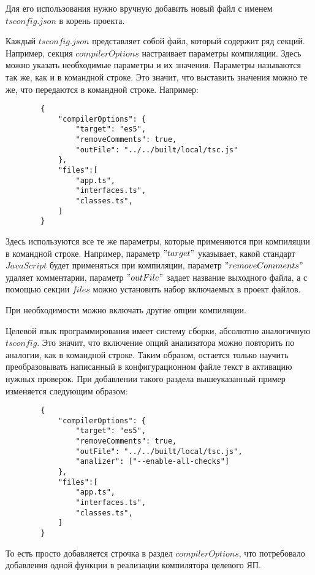 \documentclass{mipt-thesis-bs}
\begin{document}
Для его использования нужно вручную добавить новый файл с именем $tsconfig.json$ в корень проекта.


Каждый $tsconfig.json$ представляет собой файл, который содержит ряд секций.
Например, секция $compilerOptions$ настраивает параметры компиляции.
Здесь можно указать необходимые параметры и их значения.
Параметры называются так же, как и в командной строке.
Это значит, что выставить значения можно те же, что передаются в командной строке. Например:

\begin{verbatim}
        {
            "compilerOptions": {
                "target": "es5",
                "removeComments": true,
                "outFile": "../../built/local/tsc.js"
            },
            "files":[
                "app.ts",
                "interfaces.ts",
                "classes.ts",
            ]
        }
\end{verbatim}

Здесь используются все те же параметры, которые применяются при компиляции в
командной строке. Например, параметр $"target"$
указывает, какой стандарт $JavaScript$ будет применяться при компиляции, параметр
$"removeComments"$ удаляет комментарии, параметр $"outFile"$ задает название выходного файла, а
с помощью секции $files$ можно установить набор включаемых в проект файлов.

При необходимости можно включать другие опции компиляции.

Целевой язык программирования имеет систему сборки, абсолютно аналогичную $tsconfig$. Это значит,
что включение опций анализатора можно повторить по аналогии, как в командной строке. Таким образом,
остается только научить преобразовывать написанный в конфигурационном файле текст в активацию
нужных проверок. При добавлении такого раздела вышеуказанный пример изменяется
следующим образом:

\begin{verbatim}
        {
            "compilerOptions": {
                "target": "es5",
                "removeComments": true,
                "outFile": "../../built/local/tsc.js",
                "analizer": ["--enable-all-checks"]
            },
            "files":[
                "app.ts",
                "interfaces.ts",
                "classes.ts",
            ]
        }
\end{verbatim}

То есть просто добавляется строчка в раздел $compilerOptions$, что потребовало добавления
одной функции в реализации компилятора целевого ЯП.
\end{document}
